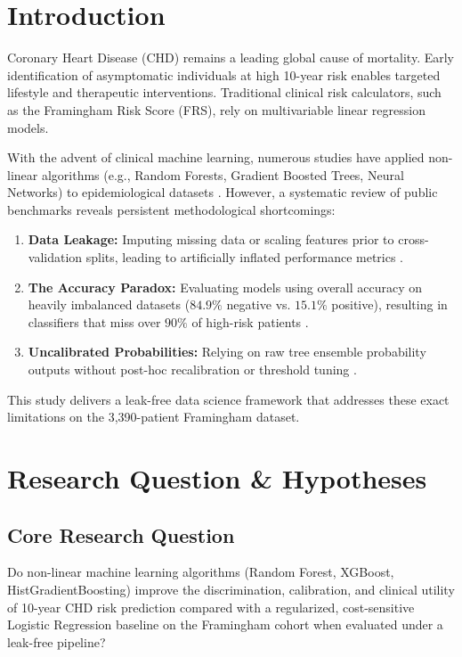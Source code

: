 \documentclass[manuscript, screen, review]{jair}
\begin{document}

\maketitle

\section{Introduction}
Coronary Heart Disease (CHD) remains a leading global cause of mortality. Early identification of asymptomatic individuals at high 10-year risk enables targeted lifestyle and therapeutic interventions. Traditional clinical risk calculators, such as the Framingham Risk Score (FRS), rely on multivariable linear regression models. 

With the advent of clinical machine learning, numerous studies have applied non-linear algorithms (e.g., Random Forests, Gradient Boosted Trees, Neural Networks) to epidemiological datasets \cite{MDPILife2025, Tasnim2025}. However, a systematic review of public benchmarks reveals persistent methodological shortcomings:
\begin{enumerate}
    \item \textbf{Data Leakage:} Imputing missing data or scaling features prior to cross-validation splits, leading to artificially inflated performance metrics \cite{Raman2026}.
    \item \textbf{The Accuracy Paradox:} Evaluating models using overall accuracy on heavily imbalanced datasets ($84.9\%$ negative vs. $15.1\%$ positive), resulting in classifiers that miss over $90\%$ of high-risk patients \cite{Medrxiv2025}.
    \item \textbf{Uncalibrated Probabilities:} Relying on raw tree ensemble probability outputs without post-hoc recalibration or threshold tuning \cite{MDPIApplSci2025}.
\end{enumerate}

This study delivers a leak-free data science framework that addresses these exact limitations on the 3,390-patient Framingham dataset.

\section{Research Question \& Hypotheses}

\subsection{Core Research Question}
Do non-linear machine learning algorithms (Random Forest, XGBoost, HistGradientBoosting) improve the discrimination, calibration, and clinical utility of 10-year CHD risk prediction compared with a regularized, cost-sensitive Logistic Regression baseline on the Framingham cohort when evaluated under a leak-free pipeline?
\end{document}
